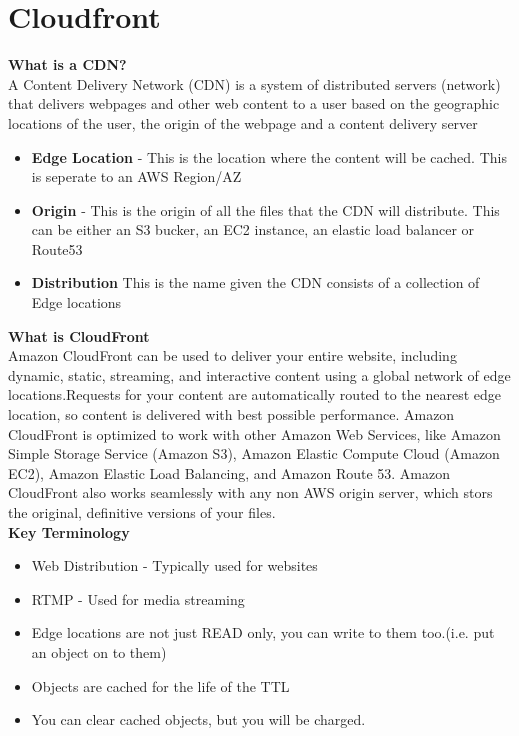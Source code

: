 \documentclass{article}
\begin{document}
\section{Cloudfront}

\textbf{What is a CDN?} \\
A Content Delivery Network (CDN) is a system of distributed servers (network) that delivers webpages and other web content to a user based on the geographic locations of the user, the origin of the webpage and a content delivery server

\begin{itemize}
\item
\textbf{Edge Location} - This is the location where the content will be cached. This is seperate to an AWS Region/AZ

\item
\textbf{Origin} - This is the origin of all the files that the CDN will distribute. This can be either an S3 bucker, an EC2 instance, an elastic load balancer or Route53

\item
\textbf{Distribution} This is the name given the CDN consists of a collection of Edge locations
\end{itemize}

\textbf{What is CloudFront} \\
Amazon CloudFront can be used to deliver your entire website, including dynamic, static, streaming, and interactive content using a global network of edge locations.Requests for your content are automatically routed to the nearest edge location, so content is delivered with best possible performance. Amazon CloudFront is optimized to work with other Amazon Web Services, like Amazon Simple Storage Service (Amazon S3), Amazon Elastic Compute Cloud (Amazon EC2), Amazon Elastic Load Balancing, and Amazon Route 53. Amazon CloudFront also works seamlessly with any non AWS origin server, which stors the original, definitive versions of your files. \\


\textbf{Key Terminology} \\
\begin{itemize}
\item
Web Distribution - Typically used for websites

\item
RTMP - Used for media streaming

\item
Edge locations are not just READ only, you can write to them too.(i.e. put an object on to them)

\item
Objects are cached for the life of the TTL

\item
You can clear cached objects, but you will be charged.

\end{itemize}
\end{document}
